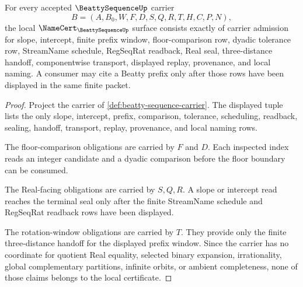 \begin{theorem}
\label{thm:beatty-sequence-namecert-obligations}
For every accepted $\BeattySequenceUp$ carrier
$$
B=(A,B_0,W,F,D,S,Q,R,T,H,C,P,N),
$$
the local $\NameCert_{\BeattySequenceUp}$ surface consists exactly of carrier admission for slope, intercept, finite prefix window, floor-comparison row, dyadic tolerance row, StreamName schedule, RegSeqRat readback, Real seal, three-distance handoff, componentwise transport, displayed replay, provenance, and local naming. A consumer may cite a Beatty prefix only after those rows have been displayed in the same finite packet.
\end{theorem}
\begin{proof}
Project the carrier of \autoref{def:beatty-sequence-carrier}. The displayed tuple lists the only slope, intercept, prefix, comparison, tolerance, scheduling, readback, sealing, handoff, transport, replay, provenance, and local naming rows.

The floor-comparison obligations are carried by $F$ and $D$. Each inspected index reads an integer candidate and a dyadic comparison before the floor boundary can be consumed.

The Real-facing obligations are carried by $S,Q,R$. A slope or intercept read reaches the terminal seal only after the finite StreamName schedule and RegSeqRat readback rows have been displayed.

The rotation-window obligations are carried by $T$. They provide only the finite three-distance handoff for the displayed prefix window. Since the carrier has no coordinate for quotient Real equality, selected binary expansion, irrationality, global complementary partitions, infinite orbits, or ambient completeness, none of those claims belongs to the local certificate.
\end{proof}

